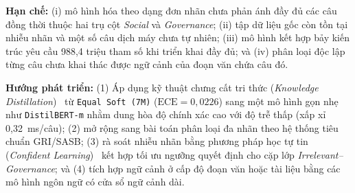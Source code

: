 \documentclass[journal,a4paper]{IEEEtran}
\newcommand{\code}[1]{\texttt{\small #1}}
\begin{document}
\textbf{Hạn chế:} (i) mô hình hóa theo dạng đơn nhãn chưa phản ánh đầy đủ các câu đồng thời thuộc hai trụ cột \textit{Social} và \textit{Governance}; (ii) tập dữ liệu gốc còn tồn tại nhiễu nhãn và một số câu dịch máy chưa tự nhiên; (iii) mô hình kết hợp bảy kiến trúc yêu cầu 988,4 triệu tham số khi triển khai đầy đủ; và (iv) phân loại độc lập từng câu chưa khai thác được ngữ cảnh của đoạn văn chứa câu đó.

\textbf{Hướng phát triển:} (1) Áp dụng kỹ thuật chưng cất tri thức (\textit{Knowledge Distillation})~\cite{hinton2015distilling} từ \code{Equal Soft (7M)} ($\text{ECE}=0{,}0226$) sang một mô hình gọn nhẹ như \code{DistilBERT-m} nhằm dung hòa độ chính xác cao với độ trễ thấp (xấp xỉ 0,32~ms/câu); (2) mở rộng sang bài toán phân loại đa nhãn theo hệ thống tiêu chuẩn GRI/SASB; (3) rà soát nhiễu nhãn bằng phương pháp học tự tin (\textit{Confident Learning})~\cite{northcutt2021confident} kết hợp tối ưu ngưỡng quyết định cho cặp lớp \textit{Irrelevant--Governance}; và (4) tích hợp ngữ cảnh ở cấp độ đoạn văn hoặc tài liệu bằng các mô hình ngôn ngữ có cửa sổ ngữ cảnh dài.
\end{document}

